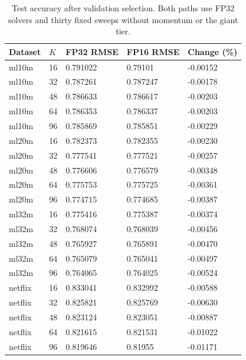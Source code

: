 \begin{table}
\centering
\caption{Test accuracy after validation selection. Both paths use FP32 solvers and thirty fixed sweeps without momentum or the giant tier.}
\begin{tabular}{lllll}
\hline
Dataset & $K$ & FP32 RMSE & FP16 RMSE & Change (\%) \\
\hline
ml10m & 16 & 0.791022 & 0.79101 & -0.00152 \\
ml10m & 32 & 0.787261 & 0.787247 & -0.00178 \\
ml10m & 48 & 0.786633 & 0.786617 & -0.00203 \\
ml10m & 64 & 0.786353 & 0.786337 & -0.00203 \\
ml10m & 96 & 0.785869 & 0.785851 & -0.00229 \\
ml20m & 16 & 0.782373 & 0.782355 & -0.00230 \\
ml20m & 32 & 0.777541 & 0.777521 & -0.00257 \\
ml20m & 48 & 0.776606 & 0.776579 & -0.00348 \\
ml20m & 64 & 0.775753 & 0.775725 & -0.00361 \\
ml20m & 96 & 0.774715 & 0.774685 & -0.00387 \\
ml32m & 16 & 0.775416 & 0.775387 & -0.00374 \\
ml32m & 32 & 0.768074 & 0.768039 & -0.00456 \\
ml32m & 48 & 0.765927 & 0.765891 & -0.00470 \\
ml32m & 64 & 0.765079 & 0.765041 & -0.00497 \\
ml32m & 96 & 0.764065 & 0.764025 & -0.00524 \\
netflix & 16 & 0.833041 & 0.832992 & -0.00588 \\
netflix & 32 & 0.825821 & 0.825769 & -0.00630 \\
netflix & 48 & 0.823124 & 0.823051 & -0.00887 \\
netflix & 64 & 0.821615 & 0.821531 & -0.01022 \\
netflix & 96 & 0.819646 & 0.81955 & -0.01171 \\
\hline
\end{tabular}
\end{table}
